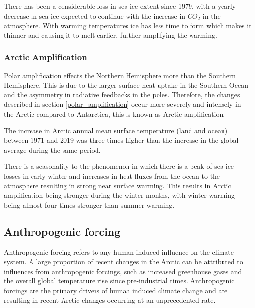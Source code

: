 \documentclass[12pt, oneside]{article}
\begin{document}
There has been a considerable loss in sea ice extent since 1979, with a yearly decrease in sea ice expected to continue with the increase in $CO_2$ in the atmosphere. With warming temperatures ice has less time to form which makes it thinner and causing it to melt earlier, further amplifying the warming. 




\subsubsection{Arctic Amplification}

Polar amplification effects the Northern Hemisphere more than the Southern Hemisphere. This is due to the larger surface heat uptake in the Southern Ocean and the asymmetry in radiative feedbacks in the poles. Therefore, the changes described in section \ref{polar_amplification} occur more severely and intensely in the Arctic compared to Antarctica, this is known as Arctic amplification\cite{england2021recent}. 

The increase in Arctic annual mean surface temperature (land and ocean) between 1971 and 2019 was three times higher than the increase in the global average during the same period\cite{AMAP}.

There is a seasonality to the phenomenon in which there is a peak of sea ice losses in early winter and increases in heat fluxes from the ocean to the atmosphere resulting in strong near surface warming. This results in Arctic amplification being stronger during the winter months, with winter warming being almost four times stronger than summer warming\cite{bintanja2013changing}. 


\subsection{Anthropogenic forcing}
Anthropogenic forcing refers to any human induced influence on the climate system. A large proportion of recent changes in the Arctic can be attributed to influences from anthropogenic forcings, such as increased greenhouse gases and the overall global temperature rise since pre-industrial times. Anthropogenic forcings are the primary drivers of human induced climate change and are resulting in recent Arctic changes occurring at an unprecedented rate. 
\end{document}
